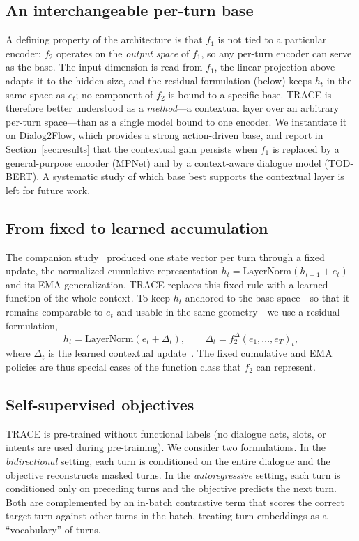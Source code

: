 \documentclass[11pt]{article}
\begin{document}
\subsection{An interchangeable per-turn base}
A defining property of the architecture is that $f_1$ is not tied to a particular encoder: $f_2$
operates on the \emph{output space} of $f_1$, so any per-turn encoder can serve as the base. The input
dimension is read from $f_1$, the linear projection above adapts it to the hidden size, and the
residual formulation (below) keeps $h_t$ in the same space as $e_t$; no component of $f_2$ is bound to
a specific base. TRACE is therefore better understood as a \emph{method}---a contextual layer over an
arbitrary per-turn space---than as a single model bound to one encoder. We instantiate it on
Dialog2Flow, which provides a strong action-driven base, and report in Section~\ref{sec:results} that
the contextual gain persists when $f_1$ is replaced by a general-purpose encoder (MPNet) and by a
context-aware dialogue model (TOD-BERT). A systematic study of which base best supports the contextual
layer is left for future work.

\subsection{From fixed to learned accumulation}
The companion study~\cite{fernandez2025retrieving} produced one state vector per turn through a fixed
update, the normalized cumulative representation $h_t = \mathrm{LayerNorm}(h_{t-1} + e_t)$ and its EMA
generalization. TRACE replaces this fixed rule with a learned function of the whole context. To keep
$h_t$ anchored to the base space---so that it remains comparable to $e_t$ and usable in the same
geometry---we use a residual formulation,
\begin{equation}
  h_t = \mathrm{LayerNorm}\!\left(e_t + \Delta_t\right),
  \qquad \Delta_t = f_2^{\Delta}(e_1,\dots,e_T)_t,
\end{equation}
where $\Delta_t$ is the learned contextual update~\cite{ba2016layer}. The fixed cumulative and EMA
policies are thus special cases of the function class that $f_2$ can represent.

\subsection{Self-supervised objectives}
TRACE is pre-trained without functional labels (no dialogue acts, slots, or intents are used during
pre-training). We consider two formulations. In the \emph{bidirectional} setting, each turn is
conditioned on the entire dialogue and the objective reconstructs masked turns. In the
\emph{autoregressive} setting, each turn is conditioned only on preceding turns and the objective
predicts the next turn. Both are complemented by an in-batch contrastive term that scores the correct
target turn against other turns in the batch, treating turn embeddings as a ``vocabulary'' of turns.
\end{document}
